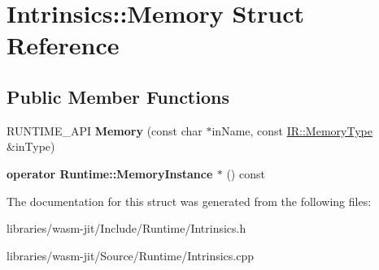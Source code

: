 \hypertarget{struct_intrinsics_1_1_memory}{}\section{Intrinsics\+:\+:Memory Struct Reference}
\label{struct_intrinsics_1_1_memory}
\subsection*{Public Member Functions}
\begin{DoxyCompactItemize}
\item 
\mbox{\label{struct_intrinsics_1_1_memory_a701e8f9d3f078f39098d71edc21afd95}} 
R\+U\+N\+T\+I\+M\+E\+\_\+\+A\+PI {\bfseries Memory} (const char $\ast$in\+Name, const \mbox{\hyperlink{struct_i_r_1_1_memory_type}{I\+R\+::\+Memory\+Type}} \&in\+Type)
\item 
\mbox{\label{struct_intrinsics_1_1_memory_a1442beacf4a5a9d94b0dc4bd141fa39e}} 
{\bfseries operator Runtime\+::\+Memory\+Instance $\ast$} () const
\end{DoxyCompactItemize}


The documentation for this struct was generated from the following files\+:\begin{DoxyCompactItemize}
\item 
libraries/wasm-\/jit/\+Include/\+Runtime/Intrinsics.\+h\item 
libraries/wasm-\/jit/\+Source/\+Runtime/Intrinsics.\+cpp\end{DoxyCompactItemize}
